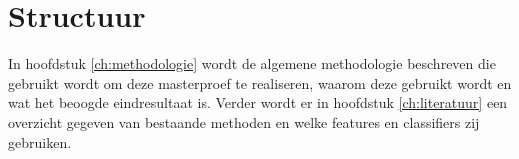 \section{Structuur}
In hoofdstuk \ref{ch:methodologie} wordt de algemene methodologie beschreven die gebruikt wordt om deze masterproef te realiseren, waarom deze gebruikt wordt en wat het beoogde eindresultaat is. Verder wordt er in hoofdstuk \ref{ch:literatuur} een overzicht gegeven van bestaande methoden en welke features en classifiers zij gebruiken.
